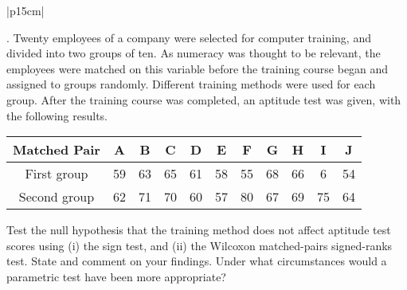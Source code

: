 \documentclass[a4paper,12pt]{article}
\begin{document}
\begin{table}[ht!]
     
\centering
     
\begin{tabular}{|p{15cm}|}
     
. Twenty employees of a company were selected for computer training, and divided into two
groups of ten. As numeracy was thought to be relevant, the employees were matched on this
variable before the training course began and assigned to groups randomly. Different
training methods were used for each group. After the training course was completed, an
aptitude test was given, with the following results.

\begin{center}
\begin{tabular}{|c|c|c|c|c|c|c|c|c|c|c|}
Matched Pair 	&	A 	&	B 	&	C 	&	D 	&	E 	&	F 	&	G 	&	H	&	 I 	&	J	\\ \hline
First group 	&	59	&	63	&	65	&	61	&	58	&	55	&	68	&	66	&	6	&	54	\\ \hline
Second group 	&	62	&	71	&	70	&	60	&	57	&	80	&	67	&	69	&	75	&	64	\\ \hline
\end{tabular}
\end{center}

Test the null hypothesis that the training method does not affect aptitude test scores using
(i) the sign test, and (ii) the Wilcoxon matched-pairs signed-ranks test. State and comment
on your findings. Under what circumstances would a parametric test have been more
appropriate?
\\ \hline
      
\end{tabular}
    
\end{table}
\end{document}
